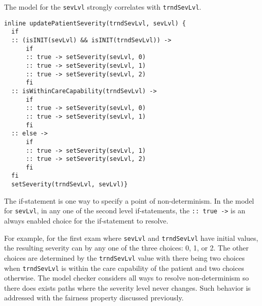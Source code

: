 The model for the \texttt{sevLvl} strongly correlates with \texttt{trndSevLvl}.
%
{\small
\begin{lstlisting}[style=myPromela]
inline updatePatientSeverity(trndSevLvl, sevLvl) {
  if
  :: (isINIT(sevLvl) && isINIT(trndSevLvl)) -> 
      if
      :: true -> setSeverity(sevLvl, 0)
      :: true -> setSeverity(sevLvl, 1)
      :: true -> setSeverity(sevLvl, 2)
      fi 
  :: isWithinCareCapability(trndSevLvl) -> 
      if
      :: true -> setSeverity(sevLvl, 0)
      :: true -> setSeverity(sevLvl, 1)
      fi
  :: else -> 
      if
      :: true -> setSeverity(sevLvl, 1)
      :: true -> setSeverity(sevLvl, 2)
      fi
  fi
  setSeverity(trndSevLvl, sevLvl)}
\end{lstlisting}
}
%
\noindent The if-statement is one way to specify a point of non-determinism. In the model for \texttt{sevLvl}, in any one of the second level if-statements, the \texttt{:: true ->} is an always enabled choice for the if-statement to resolve. 

For example, for the first exam where \texttt{sevLvl} and \texttt{trndSevLvl} have initial values, the resulting severity can by any one of the three choices: 0, 1, or 2. The other choices are determined by the \texttt{trndSevLvl} value with there being two choices when \texttt{trndSevLvl} is within the care capability of the patient and two choices otherwise. The model checker considers all ways to resolve non-determinism so there does exists paths where the severity level never changes. Such behavior is addressed with the fairness property discussed previously.

\begin{comment}
The final note is that the model synchronizes the value of \texttt{trndSevLvl} after choosing a value for \texttt{sevLvl}. The reasoning is that \texttt{sevLvl} should only be updated at the time of an actual exam. As such, \texttt{trndSevLvl} should reflect the outcome of that exam since the two values are strongly correlated.

Of note is that the model may never assign \texttt{sevLvl} to zero! It is possible for the model checker to resolve the non-determinism in such a way that \texttt{sevLvl} is always one. The result is that the patient may never be discharged and may never expire at the same time. Such behavior exists in the model but is not consistent with the real world. These are part of the sound over-approximation, and when necessary, are constrained out by changing the model or constraining what behaviors are considered in the model with a fairness property as discussed previously.
\end{comment}


